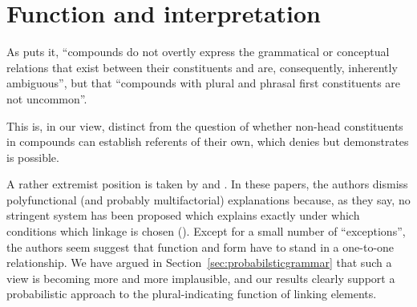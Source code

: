 \section{Function and interpretation}
\label{sec:functionandinterpretation}


As \parencite[365--366]{Olsen2015} puts it, ``compounds do not overtly express the grammatical or conceptual relations that exist between their constituents and are, consequently, inherently ambiguous'', but that ``compounds with plural and phrasal first constituents are not uncommon''.

This is, in our view, distinct from the question of whether non-head constituents in compounds can establish referents of their own, which \textcite[366]{Olsen2015} denies but \textcite{Dressler1987} demonstrates is possible.

A rather extremist position is taken by \textcite{NeefBorgwaldt2012} and \textcite{Neef2015}.
In these papers, the authors dismiss polyfunctional (and probably multifactorial) explanations because, as they say, no stringent system has been proposed which explains exactly under which conditions which linkage is chosen (\egg \citealt[27--29]{NeefBorgwaldt2012}).
Except for a small number of ``exceptions'', the authors seem suggest that function and form have to stand in a one-to-one relationship.
We have argued in Section~\ref{sec:probabilsticgrammar} that such a view is becoming more and more implausible, and our results clearly support a probabilistic approach to the plural-indicating function of linking elements.


